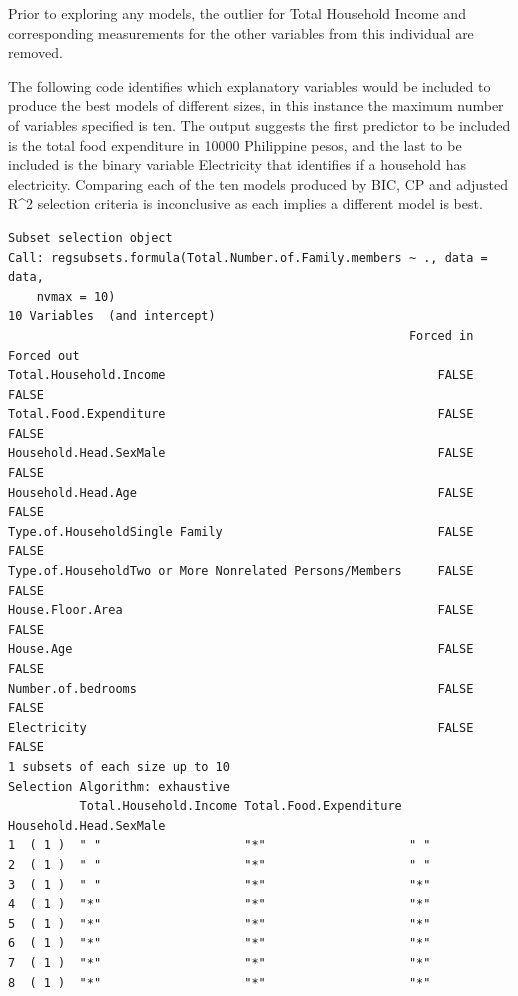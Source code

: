 \documentclass[
]{article}
\begin{document}
Prior to exploring any models, the outlier for Total Household Income
and corresponding measurements for the other variables from this
individual are removed.

The following code identifies which explanatory variables would be
included to produce the best models of different sizes, in this instance
the maximum number of variables specified is ten. The output suggests
the first predictor to be included is the total food expenditure in
10000 Philippine pesos, and the last to be included is the binary
variable Electricity that identifies if a household has electricity.
Comparing each of the ten models produced by BIC, CP and adjusted R\^{}2
selection criteria is inconclusive as each implies a different model is
best.

\begin{verbatim}
Subset selection object
Call: regsubsets.formula(Total.Number.of.Family.members ~ ., data = data, 
    nvmax = 10)
10 Variables  (and intercept)
                                                        Forced in Forced out
Total.Household.Income                                      FALSE      FALSE
Total.Food.Expenditure                                      FALSE      FALSE
Household.Head.SexMale                                      FALSE      FALSE
Household.Head.Age                                          FALSE      FALSE
Type.of.HouseholdSingle Family                              FALSE      FALSE
Type.of.HouseholdTwo or More Nonrelated Persons/Members     FALSE      FALSE
House.Floor.Area                                            FALSE      FALSE
House.Age                                                   FALSE      FALSE
Number.of.bedrooms                                          FALSE      FALSE
Electricity                                                 FALSE      FALSE
1 subsets of each size up to 10
Selection Algorithm: exhaustive
          Total.Household.Income Total.Food.Expenditure Household.Head.SexMale
1  ( 1 )  " "                    "*"                    " "                   
2  ( 1 )  " "                    "*"                    " "                   
3  ( 1 )  " "                    "*"                    "*"                   
4  ( 1 )  "*"                    "*"                    "*"                   
5  ( 1 )  "*"                    "*"                    "*"                   
6  ( 1 )  "*"                    "*"                    "*"                   
7  ( 1 )  "*"                    "*"                    "*"                   
8  ( 1 )  "*"                    "*"                    "*"                   

\end{verbatim}
\end{document}
